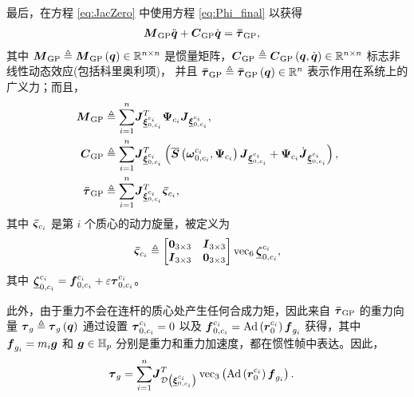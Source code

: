 最后，在方程 \eqref{eq:JacZero} 中使用方程 \eqref{eq:Phi_final} 以获得
\begin{align}
\boldsymbol{M}_{\text{GP}}\ddot{\boldsymbol{q}}+\boldsymbol{C}_{\text{GP}}\dot{\boldsymbol{q}} & =\boldsymbol{\bar{\tau}}_{\mathrm{GP}},\label{eq:EulerLagrangeEq}
\end{align}
其中 $\boldsymbol{M}_{\text{GP}}\triangleq\boldsymbol{M}_{\text{GP}}\left(\boldsymbol{q}\right)\in\mathbb{R}^{n\times n}$
是惯量矩阵，$\boldsymbol{C}_{\text{GP}}\triangleq\boldsymbol{C}_{\text{GP}}\left(\boldsymbol{q},\dot{\boldsymbol{q}}\right)\in\mathbb{R}^{n\times n}$
标志非线性动态效应(包括科里奥利项)，
并且 $\boldsymbol{\bar{\tau}}_{\mathrm{GP}}\triangleq\boldsymbol{\bar{\tau}}_{\mathrm{GP}}\left(\boldsymbol{q}\right)\in\mathbb{R}^{n}$
表示作用在系统上的广义力；而且， 
\begin{align}
\boldsymbol{M}_{\text{GP}} & \triangleq\underset{i=1}{\sum^{n}}\boldsymbol{J}_{\underline{\boldsymbol{\xi}}_{0,c_{i}}^{c_{i}}}^{T}\boldsymbol{\Psi}_{c_{i}}\boldsymbol{J}_{\underline{\boldsymbol{\xi}}_{0,c_{i}}^{c_{i}}},\label{eq:InertiaMatrix}\\
\boldsymbol{C}_{\text{GP}} & \triangleq\underset{i=1}{\sum^{n}}\boldsymbol{J}_{\underline{\boldsymbol{\xi}}_{0,c_{i}}^{c_{i}}}^{T}\left(\overline{\boldsymbol{S}}\left(\boldsymbol{\omega}_{0,c_{i}}^{c_{i}},\boldsymbol{\Psi}_{c_{i}}\right)\boldsymbol{J}_{\underline{\boldsymbol{\xi}}_{0,c_{i}}^{c_{i}}}+\boldsymbol{\Psi}_{c_{i}}\dot{\boldsymbol{J}}_{\underline{\boldsymbol{\xi}}_{0,c_{i}}^{c_{i}}}\right),\label{eq:CoriolisMatrix}\\
\boldsymbol{\bar{\tau}}_{\mathrm{GP}} & \triangleq\underset{i=1}{\sum^{n}}\boldsymbol{J}_{\underline{\boldsymbol{\xi}}_{0,c_{i}}^{c_{i}}}^{T}\boldsymbol{\bar{\varsigma}}_{c_{i}},\label{eq:GeneralizedForcesVector}
\end{align}
其中 $\boldsymbol{\bar{\varsigma}}_{c_{i}}$ 是第 $i$ 个质心的动力旋量，被定义为
\begin{equation}
\boldsymbol{\bar{\varsigma}}_{c_{i}}\triangleq\begin{bmatrix}\boldsymbol{0}_{3\times3} & \boldsymbol{I}_{3\times3}\\
\boldsymbol{I}_{3\times3} & \boldsymbol{0}_{3\times3}
\end{bmatrix}\operatorname{vec}_{6}\underline{\boldsymbol{\zeta}}_{0,c_{i}}^{c_{i}},\label{eq:torques_c_i}
\end{equation}
其中 $\underline{\boldsymbol{\zeta}}_{0,c_{i}}^{c_{i}}=\boldsymbol{f}_{0,c_{i}}^{c_{i}}+\varepsilon\boldsymbol{\tau}_{0,c_{i}}^{c_{i}}$。

此外，由于重力不会在连杆的质心处产生任何合成力矩，因此来自 $\boldsymbol{\bar{\tau}}_{\mathrm{GP}}$ 的重力向量 $\boldsymbol{\tau}_{g}\triangleq\boldsymbol{\tau}_{g}\left(\boldsymbol{q}\right)$ 通过设置 $\boldsymbol{\tau}_{0,c_{i}}^{c_{i}}=0$ 以及 $\boldsymbol{f}_{0,c_{i}}^{c_{i}}=\mathrm{Ad}\left(\boldsymbol{r}_{0}^{c_{i}}\right)\boldsymbol{f}_{g_{i}}$ 获得，其中 $\boldsymbol{f}_{g_{i}}=m_{i}\boldsymbol{g}$ 和 $\boldsymbol{g}\in\mathbb{H}_{p}$ 分别是重力和重力加速度，都在惯性帧中表达。因此，
\begin{align}
\boldsymbol{\tau}_{g} & =\underset{i=1}{\sum^{n}}\boldsymbol{J}_{\operatorname{\mathcal{D}}\left(\underline{\boldsymbol{\xi}}_{0,c_{i}}^{c_{i}}\right)}^{T}\operatorname{vec}_{3}\left(\mathrm{Ad}\left(\boldsymbol{r}_{0}^{c_{i}}\right)\boldsymbol{f}_{g_{i}}\right).\label{eq:GravityForcesVector}
\end{align}

